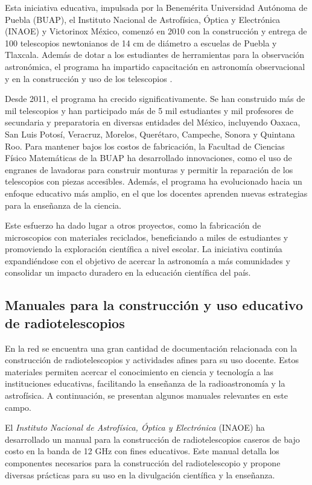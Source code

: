 Esta iniciativa educativa, impulsada por la Benemérita Universidad Autónoma de
Puebla (BUAP), el Instituto Nacional de Astrofísica, Óptica y Electrónica (INAOE)
y Victorinox México, comenzó en 2010 con la construcción y entrega de 100
telescopios newtonianos de 14 cm de diámetro a escuelas de Puebla y Tlaxcala.
Además de dotar a los estudiantes de herramientas para la observación astronómica,
el programa ha impartido capacitación en astronomía observacional y en la
construcción y uso de los telescopios \parencite{AIDCT2011}.

Desde 2011, el programa ha crecido significativamente. Se han construido más de
mil telescopios y han participado más de 5 mil estudiantes y mil profesores de
secundaria y preparatoria en diversas entidades del México, incluyendo Oaxaca,
San Luis Potosí, Veracruz, Morelos, Querétaro, Campeche, Sonora y Quintana Roo.
Para mantener bajos los costos de fabricación, la Facultad de Ciencias Físico
Matemáticas de la BUAP ha desarrollado innovaciones, como el uso de engranes de
lavadoras para construir monturas y permitir la reparación de los telescopios
con piezas accesibles. Además, el programa ha evolucionado hacia un enfoque
educativo más amplio, en el que los docentes aprenden nuevas estrategias para la
enseñanza de la ciencia. \parencite{BoletinesBUAP2021}

Este esfuerzo ha dado lugar a otros proyectos, como la fabricación de microscopios
con materiales reciclados, beneficiando a miles de estudiantes y promoviendo la
exploración científica a nivel escolar.
La iniciativa continúa expandiéndose con el objetivo de acercar la astronomía a
más comunidades y consolidar un impacto duradero en la educación científica del
país.

\subsection{Manuales para la construcción y uso educativo de radiotelescopios}

En la red se encuentra una gran cantidad de documentación relacionada con la
construcción de radiotelescopios y actividades afines para su uso docente.
Estos materiales permiten acercar el conocimiento en ciencia y tecnología a las
instituciones educativas, facilitando la enseñanza de la radioastronomía y la
astrofísica.
A continuación, se presentan algunos manuales relevantes en este campo.

El \emph{Instituto Nacional de Astrofísica, Óptica y Electrónica} (INAOE) ha
desarrollado un manual para la construcción de radiotelescopios caseros de bajo
costo en la banda de 12 GHz con fines educativos. \parencite{AbrahamLuna2021}
Este manual detalla los componentes necesarios para la construcción del
radiotelescopio y propone diversas prácticas para su uso en la divulgación
científica y la enseñanza.

